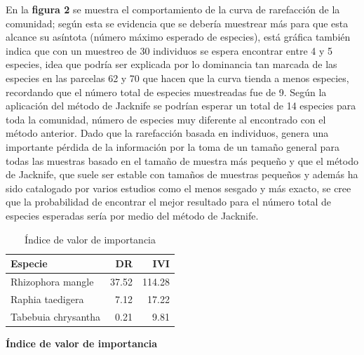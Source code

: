 \documentclass[conference,final,12pt,]{IEEEtran}
\begin{document}
En la \textbf{figura 2} se muestra el comportamiento de la curva de
rarefacción de la comunidad; según esta se evidencia que se debería
muestrear más para que esta alcance su asíntota (número máximo esperado
de especies), está gráfica también indica que con un muestreo de 30
individuos se espera encontrar entre 4 y 5 especies, idea que podría ser
explicada por lo dominancia tan marcada de las especies en las parcelas
62 y 70 que hacen que la curva tienda a menos especies, recordando que
el número total de especies muestreadas fue de 9. Según la aplicación
del método de Jacknife se podrían esperar un total de 14 especies para
toda la comunidad, número de especies muy diferente al encontrado con el
método anterior. Dado que la rarefacción basada en individuos, genera
una importante pérdida de la información por la toma de un tamaño
general para todas las muestras basado en el tamaño de muestra más
pequeño\citep{AQ} y que el método de Jacknife, que suele ser estable con
tamaños de muestras pequeños \citep{AR} y además ha sido catalogado por
varios estudios \cite{AS,AT,AU} como el menos sesgado y
más exacto, se cree que la probabilidad de encontrar el mejor resultado
para el número total de especies esperadas sería por medio del método de
Jacknife.

\begin{table}[htb]

\caption{\label{tab:unnamed-chunk-7}Índice de valor de importancia}
\centering
\begin{tabular}[t]{l|r|r}
\hline
Especie & DR & IVI\\
\hline
Rhizophora mangle & 37.52 & 114.28\\
\hline
Raphia taedigera & 7.12 & 17.22\\
\hline
Tabebuia chrysantha & 0.21 & 9.81\\
\hline
\end{tabular}
\end{table}

\textbf{Índice de valor de importancia}
\end{document}
